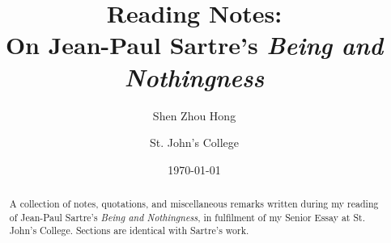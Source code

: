 \documentclass[
  10pt,       %
  letterpaper,    %
  final,      %
  onecolumn,  %
  oneside,    %
  notitlepage %
]{article}
\title{
  Reading Notes: \\ On Jean-Paul Sartre's \emph{Being and Nothingness}
}
\author{
  Shen Zhou Hong \and St. John's College
}
\date{\today}
\begin{document}
\maketitle
\begin{abstract}
\noindent
  A collection of notes, quotations, and miscellaneous remarks written during my reading of Jean-Paul Sartre's \emph{Being and Nothingness}, in fulfilment of my Senior Essay at St. John's College. Sections are identical with Sartre's work.
\end{abstract}
\tableofcontents %

% 


\appendix

\end{document}
